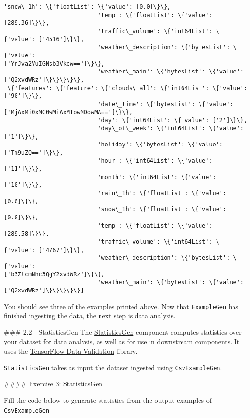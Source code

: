 \documentclass[11pt]{article}
\begin{document}
\begin{Verbatim}[commandchars=\\\{\}]
                           'snow\_1h': \{'floatList': \{'value': [0.0]\}\},
                           'temp': \{'floatList': \{'value': [289.36]\}\},
                           'traffic\_volume': \{'int64List': \{'value': ['4516']\}\},
                           'weather\_description': \{'bytesList': \{'value':
['YnJva2VuIGNsb3Vkcw==']\}\},
                           'weather\_main': \{'bytesList': \{'value':
['Q2xvdWRz']\}\}\}\}\},
 \{'features': \{'feature': \{'clouds\_all': \{'int64List': \{'value': ['90']\}\},
                           'date\_time': \{'bytesList': \{'value':
['MjAxMi0xMC0wMiAxMTowMDowMA==']\}\},
                           'day': \{'int64List': \{'value': ['2']\}\},
                           'day\_of\_week': \{'int64List': \{'value': ['1']\}\},
                           'holiday': \{'bytesList': \{'value': ['Tm9uZQ==']\}\},
                           'hour': \{'int64List': \{'value': ['11']\}\},
                           'month': \{'int64List': \{'value': ['10']\}\},
                           'rain\_1h': \{'floatList': \{'value': [0.0]\}\},
                           'snow\_1h': \{'floatList': \{'value': [0.0]\}\},
                           'temp': \{'floatList': \{'value': [289.58]\}\},
                           'traffic\_volume': \{'int64List': \{'value': ['4767']\}\},
                           'weather\_description': \{'bytesList': \{'value':
['b3ZlcmNhc3QgY2xvdWRz']\}\},
                           'weather\_main': \{'bytesList': \{'value':
['Q2xvdWRz']\}\}\}\}\}]
    \end{Verbatim}

    You should see three of the examples printed above. Now that
\texttt{ExampleGen} has finished ingesting the data, the next step is
data analysis.

    \#\#\# 2.2 - StatisticsGen The
\href{https://www.tensorflow.org/tfx/guide/statsgen}{StatisticsGen}
component computes statistics over your dataset for data analysis, as
well as for use in downstream components. It uses the
\href{https://www.tensorflow.org/tfx/data_validation/get_started}{TensorFlow
Data Validation} library.

\texttt{StatisticsGen} takes as input the dataset ingested using
\texttt{CsvExampleGen}.

    \#\#\#\# Exercise 3: StatisticsGen

Fill the code below to generate statistics from the output examples of
\texttt{CsvExampleGen}.
\end{document}
